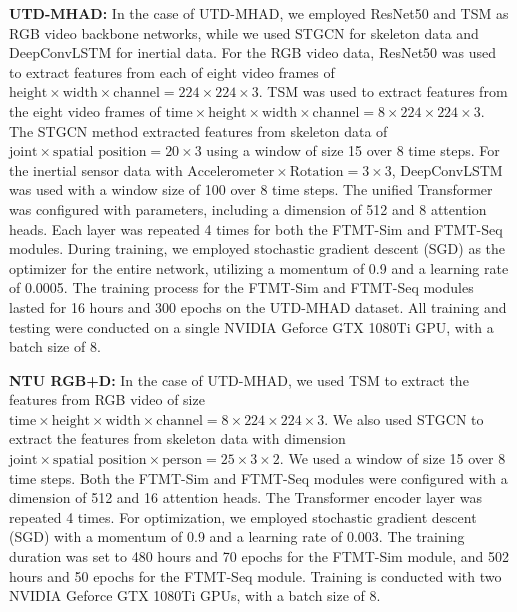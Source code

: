 \textbf{UTD-MHAD:} 
In the case of UTD-MHAD,  we employed ResNet50 \cite{he2016deep} and TSM \cite{lin2019tsm} as RGB video backbone networks, while we used STGCN \cite{yu2018spatio} for skeleton data and DeepConvLSTM \cite{singh2020deep} for inertial data. 
For the RGB video data, ResNet50 was used to extract features from each of eight video frames of  $\textrm{height} \times \textrm{width} \times \textrm{channel} = 224 \times 224 \times 3$.  TSM was used to extract features from the eight video frames of $\mathrm{time} \times \mathrm{height} \times \mathrm{width} \times \mathrm{channel} = 8 \times 224 \times 224 \times 3$. The STGCN method extracted features from skeleton data of $\textrm{joint} \times \textrm{spatial position} = 20 \times 3$ using a window of size 15 over 8 time steps. For the inertial sensor data with $\textrm{Accelerometer} \times \textrm{Rotation} = 3 \times 3$, DeepConvLSTM was used with a window size of 100 over 8 time steps. The unified Transformer was configured with parameters, including a dimension of 512 and 8 attention heads.
Each layer was repeated 4 times for both the FTMT-Sim and FTMT-Seq modules.
During training, we employed stochastic gradient descent (SGD) as the optimizer for the entire network, utilizing a momentum of 0.9 and a learning rate of 0.0005. The training process for the FTMT-Sim and FTMT-Seq modules lasted for 16 hours and 300 epochs on the UTD-MHAD dataset. All training and testing were conducted on a single NVIDIA Geforce GTX 1080Ti GPU, with a batch size of 8.

\textbf{NTU RGB+D:} 
In the case of UTD-MHAD, we used TSM \cite{lin2019tsm} to extract the features from RGB video of size $\mathrm{time} \times \mathrm{height} \times \mathrm{width} \times \mathrm{channel} = 8 \times 224 \times 224 \times 3$. We also used STGCN to extract the features from skeleton data with dimension $\mathrm{joint} \times \mathrm{spatial}\,\,\mathrm{position} \times \mathrm{person} = 25 \times 3 \times 2$. We used a window of size 15 over 8 time steps. 
Both the FTMT-Sim and FTMT-Seq modules were configured with a dimension of 512 and 16 attention heads.
The Transformer encoder layer was repeated 4 times.
For optimization, we employed stochastic gradient descent (SGD) with a momentum of 0.9 and a learning rate of 0.003. The training duration was set to 480 hours and 70 epochs for the FTMT-Sim module, and 502 hours and 50 epochs for the FTMT-Seq module. Training is conducted with two NVIDIA Geforce GTX 1080Ti GPUs, with a batch size of 8.

